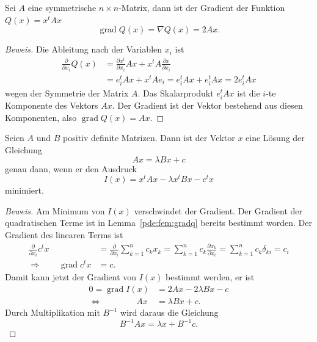 \begin{lemma}
\label{pde:fem:gradq}
Sei $A$ eine symmetrische $n\times n$-Matrix, dann ist der Gradient der
Funktion $Q(x) = x^t Ax$
\[
\operatorname{grad}Q(x)
=
\nabla Q(x)
=
2Ax.
\]
\end{lemma}

\begin{proof}[Beweis]
Die Ableitung nach der Variablen $x_i$ ist
\begin{align*}
\frac{\partial}{\partial x_i} Q(x)
&=
\frac{\partial x^t}{\partial x_i} Ax
+
x^t A \frac{\partial x}{\partial x_i}
\\
&=
e_i^t Ax
+
x^tAe_i
=
e_i^t Ax
+
e_i^t Ax
=
2e_i^t Ax
\end{align*}
wegen der Symmetrie der Matrix $A$.
Das Skalarprodukt $e_i^t Ax$ ist die $i$-te Komponente des Vektors $Ax$.
Der Gradient ist der Vektor bestehend aus diesen Komponenten, also
$\operatorname{grad}Q(x) = Ax$.
\end{proof}

\begin{satz}
Seien $A$ und $B$ positiv definite Matrizen.
Dann ist der Vektor $x$ eine Lösung der Gleichung
\[
Ax=\lambda Bx+c
\]
genau dann, wenn er den Ausdruck
\[
I(x)
=
x^tAx - \lambda x^tBx - c^tx
\]
minimiert.
\end{satz}

\begin{proof}[Beweis]
Am Minimum von $I(x)$ verschwindet der Gradient.
Der Gradient der quadratischen Terme ist in Lemma~\ref{pde:fem:gradq}
bereits bestimmt worden.
Der Gradient des linearen Terms ist
\begin{align*}
\frac{\partial}{\partial x_i}c^tx
&=
\frac{\partial}{\partial x_i}\sum_{k=1}^n c_kx_k
=
\sum_{k=1}^n c_k\frac{\partial x_k}{\partial x_i}
=
\sum_{k=1}^n c_k\delta_{ki}
=
c_i
\\
\Rightarrow\qquad
\operatorname{grad}c^tx&=c.
\end{align*}
Damit kann jetzt der Gradient von $I(x)$ bestimmt werden, er ist
\begin{align*}
0=\operatorname{grad}I(x)
&=
2Ax - 2\lambda Bx - c
\\
\Leftrightarrow
\qquad
\qquad
Ax&=\lambda Bx+c.
\end{align*}
Durch Multiplikation mit $B^{-1}$ wird daraus die Gleichung
\[
B^{-1}Ax=\lambda x + B^{-1}c.
\]
\end{proof}




